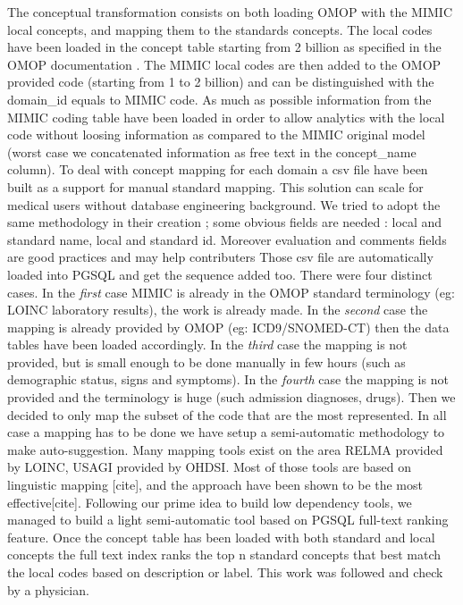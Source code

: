The conceptual transformation consists on both loading OMOP with the MIMIC
local concepts, and mapping them to the standards concepts. 
The local codes have been loaded in the concept table starting from 2 billion
as specified in the OMOP documentation \cite{omop-documentation-pdf}. The
MIMIC local codes are then added to the OMOP provided code (starting from 1 to
2 billion) and can be distinguished with the domain_id equals to MIMIC code. As
much as possible information from the MIMIC coding table have been loaded in
order to allow analytics with the local code without loosing information as
compared to the MIMIC original model (worst case we concatenated information as
free text in the concept_name column).
To deal with concept mapping for each domain a csv file have been built as a
support for manual standard mapping. This solution can scale for medical users
without database engineering background. We tried to adopt the same methodology
in their creation ; some obvious fields are needed : local and standard name,
local and standard id. Moreover evaluation and comments fields are good
practices and may help contributers Those csv file are automatically loaded
into PGSQL and get the sequence added too. There were four distinct cases.  In the
\emph{first} case MIMIC is already in the OMOP standard terminology (eg: LOINC
laboratory results), the work is already made.  In the \emph{second} case the
mapping is already provided by OMOP (eg: ICD9/SNOMED-CT) then the data tables
have been loaded accordingly.  In the \emph{third} case the mapping is not
provided, but is small enough to be done manually in few hours (such as
demographic status, signs and symptoms).  In the \emph{fourth} case the mapping
is not provided and the terminology is huge (such admission diagnoses, drugs).
Then we decided to only map the subset of the code that are the most
represented.
In all case a mapping has to be done we have setup a semi-automatic methodology
to make auto-suggestion. Many mapping tools exist on the area RELMA provided by
LOINC, USAGI provided by OHDSI. Most of those tools are based on linguistic
mapping [cite], and the approach have been shown to be the most
effective[cite]. Following our prime idea to build low dependency tools, we
managed to build a light semi-automatic tool based on PGSQL full-text ranking
feature.  Once the concept table has been loaded with both standard and local
concepts the full text index ranks the top n standard concepts that best match
the local codes based on description or label.  This work was followed and
check by a physician.

